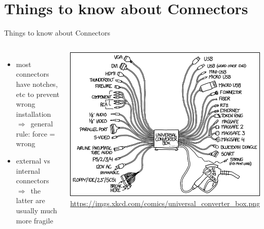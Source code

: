 \documentclass[10pt, graphics, aspectratio=169, table]{beamer}
\newcommand{\ra}{$\Rightarrow$\ }
\begin{document}
	\section{Things to know about Connectors}
    \begin{frame}{Things to know about Connectors}
        \begin{columns}
                \begin{itemize}
                    \item most connectors have notches, etc to prevent wrong installation \ra general rule: force = wrong
                    \item external vs internal connectors \ra the latter are  usually much more fragile
                \end{itemize}
                \center\includegraphics[scale=0.25]{img/connectors.png}
                \center\tiny\url{https://imgs.xkcd.com/comics/universal_converter_box.png}
        \end{columns}
    \end{frame}
\end{document}
